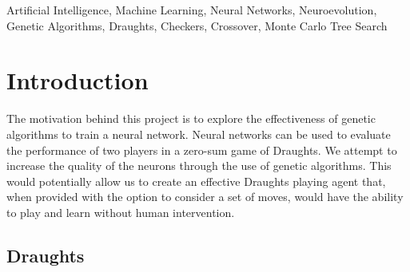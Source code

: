 \documentclass[12pt,a4paper]{article}
\begin{document}
\begin{abstract}
    {\bf Results}

    Overall, the neuroevolutionary approach has shown to learn and improve over time. The net learning rate was positive. However, the wide scope of the adjustments afforded may have impacted the learning rate and has consequently shown to be volatile in some situations. The use of crossovers may dramatically influence the quality of the learning.

    {\bf Conclusion}

    Under the premise that the fitness function is well defined, neuroevolution can be considered as an option to create a draughts playing AI. However, the robustness of the system is quite volatile. To counteract this, the system is  best paired with mutation and crossover methods that are not heavily reliant on entropy.

\end{abstract}
\begin{keywords}
    Artificial Intelligence, Machine Learning, Neural Networks, Neuroevolution, Genetic Algorithms, Draughts, Checkers, Crossover, Monte Carlo Tree Search
\end{keywords}
\section{Introduction}
    The motivation behind this project is to explore the effectiveness of genetic algorithms to train a neural network. Neural networks can be used to evaluate the performance of two players in a zero-sum game of Draughts. We attempt to increase the quality of the neurons through the use of genetic algorithms. This would potentially allow us to create an effective Draughts playing agent that, when provided with the option to consider a set of moves, would have the ability to play and learn without human intervention.

    \subsection{Draughts}
\end{document}
